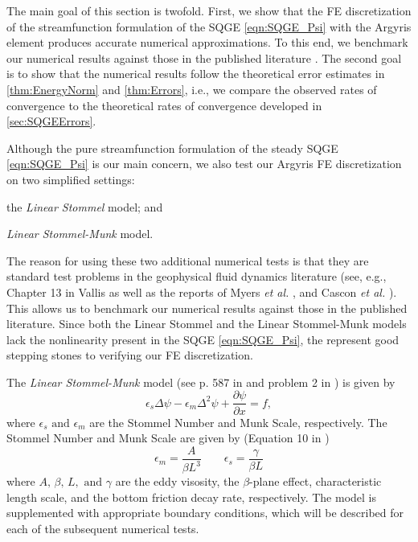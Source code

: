The main goal of this section is twofold. First, we show that the FE
discretization of the streamfunction formulation of the SQGE \eqref{eqn:SQGE_Psi}
with the Argyris element produces accurate numerical approximations. To this
end, we benchmark our numerical results against those in the published
literature \cite{Vallis06, Cascon, Myers}. The second goal is to show that the
numerical results follow the theoretical error estimates in
\autoref{thm:EnergyNorm} and \autoref{thm:Errors}, i.e., we compare the observed
rates of convergence to the theoretical rates of convergence developed in
\autoref{sec:SQGEErrors}.

Although the pure streamfunction formulation of the steady SQGE
\eqref{eqn:SQGE_Psi} is our main concern, we also test our Argyris FE
discretization on two simplified settings: \begin{inparaenum}[(i)] \item the
\emph{Linear Stommel} model; and \item \emph{Linear Stommel-Munk} model.
\end{inparaenum} The reason for using these two additional numerical tests is
that they are standard test problems in the geophysical fluid dynamics
literature (see, e.g., Chapter 13 in Vallis \cite{Vallis06} as well as the
reports of Myers \emph{et al.} \cite{Myers}, and Cascon \emph{et al.}
\cite{Cascon}). This allows us to benchmark our numerical results against
those in the published literature. Since both the Linear Stommel and the
Linear Stommel-Munk models lack the nonlinearity present in the SQGE
\eqref{eqn:SQGE_Psi}, the represent good stepping stones to verifying our FE
discretization.

The \emph{Linear Stommel-Munk} model (see p. 587 in \cite{Vallis06} and problem
2 in \cite{Cascon}) is given by
\begin{equation}
  \epsilon_s \Delta \psi - \epsilon_m \Delta^2 \psi + \frac{\partial \psi}{\partial x} = f,
  \label{eqn:Stommel-Munk}
\end{equation}
where $\epsilon_s \text{ and } \epsilon_m$ are the Stommel Number and Munk
Scale, respectively. The Stommel Number and Munk Scale are given by (Equation 10
in \cite{Myers})
\begin{equation*}
  \epsilon_m = \frac{A}{\beta L^3} \qquad \epsilon_s = \frac{\gamma}{\beta L}
\end{equation*}
where $A,\, \beta,\, L, \text{ and } \gamma$ are the eddy visosity, the
$\beta$-plane effect, characteristic length scale, and the bottom friction decay
rate, respectively. The model is supplemented with appropriate boundary
conditions, which will be described for each of the subsequent numerical tests.

